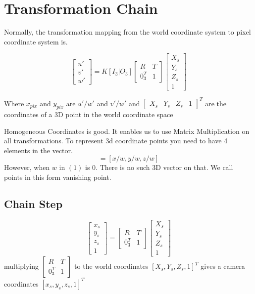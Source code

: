 \documentclass[a4paper, twoside, english]{article}
\begin{document}
\section{Transformation Chain}

Normally, the transformation mapping from the world coordinate system to pixel coordinate system is.

\begin{equation*}
	\begin{bmatrix}
		u' \\
		v' \\
		w'
	\end{bmatrix} = K[I_3| O_3]
	\begin{bmatrix}
	R & T \\
	0_3^T & 1
	\end{bmatrix}
	\begin{bmatrix}
	X_s \\
	Y_s \\
	Z_s \\
	1
	\end{bmatrix}
\end{equation*}


Where $x_{pix}$ and $y_{pix}$ are $u'/w'$ and $v'/w'$ 
and $
\begin{bmatrix}
	X_s & Y_s & Z_s & 1
\end{bmatrix}^T 
$ are the coordinates of a 3D point in the world coordinate space

Homogeneous Coordinates is good. It enables us to use Matrix Multiplication on all transformations. To represent 3d coordinate points you need to have 4 elements in the vector.
\begin{equation}
[x,y,z,w] = [x/w,y/w,z/w]
\end{equation}
However, when $w$ in $(1)$ is $0$. There is no such 3D vector on that. We call points in this form vanishing point.\cite{TheTruthBehindHomoCoords}

\subsection{Chain Step}
\begin{equation*}
\begin{bmatrix}
x_s \\
y_s \\
z_s \\
1
\end{bmatrix}
=
\begin{bmatrix}
	R & T \\
	0_3^T & 1
\end{bmatrix}
\begin{bmatrix}
	X_s \\
	Y_s \\
	Z_s \\
	1
\end{bmatrix}
\end{equation*}
multiplying $\begin{bmatrix}
R & T \\
0_3^T & 1
\end{bmatrix}$ to the world coordinates $[X_s,Y_s,Z_s,1]^T$ gives a camera coordinates $[x_s,y_s,z_s,1]^T$
\end{document}
